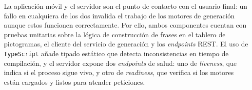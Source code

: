 La aplicación móvil y el servidor son el punto de contacto con el usuario final: un fallo en cualquiera de los dos invalida el trabajo de los motores de generación aunque estos funcionen correctamente. Por ello, ambos componentes cuentan con pruebas unitarias sobre la lógica de construcción de frases en el tablero de pictogramas, el cliente del servicio de generación y los \textit{endpoints} REST. El uso de \texttt{TypeScript} añade tipado estático que detecta inconsistencias en tiempo de compilación, y el servidor expone dos \textit{endpoints} de salud: uno de \textit{liveness}, que indica si el proceso sigue vivo, y otro de \textit{readiness}, que verifica si los motores están cargados y listos para atender peticiones.
